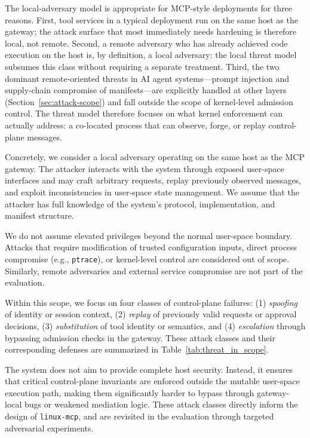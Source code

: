 The local-adversary model is appropriate for MCP-style deployments for three reasons.
First, tool services in a typical deployment run on the same host as the gateway; the attack surface that most immediately needs hardening is therefore local, not remote.
Second, a remote adversary who has already achieved code execution on the host is, by definition, a local adversary: the local threat model subsumes this class without requiring a separate treatment.
Third, the two dominant remote-oriented threats in AI agent systems---prompt injection and supply-chain compromise of manifests---are explicitly handled at other layers (Section~\ref{sec:attack-scope}) and fall outside the scope of kernel-level admission control.
The threat model therefore focuses on what kernel enforcement can actually address: a co-located process that can observe, forge, or replay control-plane messages.

Concretely, we consider a local adversary operating on the same host as the MCP gateway.
The attacker interacts with the system through exposed user-space interfaces and may craft arbitrary requests, replay previously observed messages, and exploit inconsistencies in user-space state management.
We assume that the attacker has full knowledge of the system’s protocol, implementation, and manifest structure.

We do not assume elevated privileges beyond the normal user-space boundary.
Attacks that require modification of trusted configuration inputs, direct process compromise (e.g., \texttt{ptrace}), or kernel-level control are considered out of scope.
Similarly, remote adversaries and external service compromise are not part of the evaluation.

Within this scope, we focus on four classes of control-plane failures:
(1) \emph{spoofing} of identity or session context,
(2) \emph{replay} of previously valid requests or approval decisions,
(3) \emph{substitution} of tool identity or semantics, and
(4) \emph{escalation} through bypassing admission checks in the gateway.
These attack classes and their corresponding defenses are summarized in Table~\ref{tab:threat_in_scope}.

The system does not aim to provide complete host security.
Instead, it ensures that critical control-plane invariants are enforced outside the mutable user-space execution path, making them significantly harder to bypass through gateway-local bugs or weakened mediation logic.
These attack classes directly inform the design of \texttt{linux-mcp}, and are revisited in the evaluation through targeted adversarial experiments.
